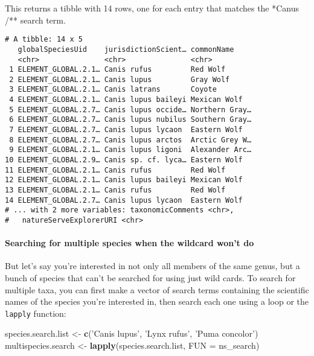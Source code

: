 \documentclass[]{article}
\newenvironment{Shaded}{\begin{snugshade}}{\end{snugshade}}
\newcommand{\DataTypeTok}[1]{\textcolor[rgb]{0.13,0.29,0.53}{#1}}
\newcommand{\KeywordTok}[1]{\textcolor[rgb]{0.13,0.29,0.53}{\textbf{#1}}}
\newcommand{\NormalTok}[1]{#1}
\newcommand{\StringTok}[1]{\textcolor[rgb]{0.31,0.60,0.02}{#1}}
\let\oldparagraph\paragraph
\renewcommand{\paragraph}[1]{\oldparagraph{#1}\mbox{}}
\begin{document}
This returns a tibble with 14 rows, one for each entry that matches the
*Canus /** search term.

\begin{verbatim}
# A tibble: 14 x 5
   globalSpeciesUid    jurisdictionScient… commonName    
   <chr>               <chr>               <chr>         
 1 ELEMENT_GLOBAL.2.1… Canis rufus         Red Wolf      
 2 ELEMENT_GLOBAL.2.1… Canis lupus         Gray Wolf     
 3 ELEMENT_GLOBAL.2.1… Canis latrans       Coyote        
 4 ELEMENT_GLOBAL.2.1… Canis lupus baileyi Mexican Wolf  
 5 ELEMENT_GLOBAL.2.7… Canis lupus occide… Northern Gray…
 6 ELEMENT_GLOBAL.2.7… Canis lupus nubilus Southern Gray…
 7 ELEMENT_GLOBAL.2.7… Canis lupus lycaon  Eastern Wolf  
 8 ELEMENT_GLOBAL.2.7… Canis lupus arctos  Arctic Grey W…
 9 ELEMENT_GLOBAL.2.1… Canis lupus ligoni  Alexander Arc…
10 ELEMENT_GLOBAL.2.9… Canis sp. cf. lyca… Eastern Wolf  
11 ELEMENT_GLOBAL.2.1… Canis rufus         Red Wolf      
12 ELEMENT_GLOBAL.2.1… Canis lupus baileyi Mexican Wolf  
13 ELEMENT_GLOBAL.2.1… Canis rufus         Red Wolf      
14 ELEMENT_GLOBAL.2.7… Canis lupus lycaon  Eastern Wolf  
# ... with 2 more variables: taxonomicComments <chr>,
#   natureServeExplorerURI <chr>
\end{verbatim}

\hypertarget{searching-for-multiple-species-when-the-wildcard-wont-do}{%
\paragraph{Searching for multiple species when the wildcard won't
do}\label{searching-for-multiple-species-when-the-wildcard-wont-do}}

But let's say you're interested in not only all members of the same
genus, but a bunch of species that can't be searched for using just wild
cards. To search for multiple taxa, you can first make a vector of
search terms containing the scientific names of the species you're
interested in, then search each one using a loop or the \texttt{lapply}
function:

\begin{Shaded}
\begin{Highlighting}[]
\NormalTok{species.search.list <-}\StringTok{ }\KeywordTok{c}\NormalTok{(}\StringTok{'Canis lupus'}\NormalTok{, }\StringTok{'Lynx rufus'}\NormalTok{, }\StringTok{'Puma concolor'}\NormalTok{)}
\NormalTok{multispecies.search <-}\StringTok{ }\KeywordTok{lapply}\NormalTok{(species.search.list, }\DataTypeTok{FUN =}\NormalTok{ ns_search)}
\end{Highlighting}
\end{Shaded}
\end{document}

